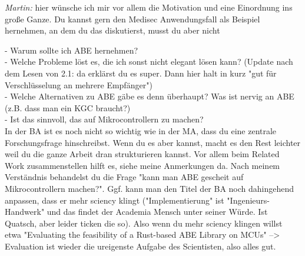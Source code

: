\emph{Martin: }
hier wünsche ich mir vor allem die Motivation und eine Einordnung ins große Ganze. Du kannst gern den Medisec Anwendungsfall als Beispiel hernehmen, an dem du das diskutierst, musst du aber nicht

- Warum sollte ich ABE hernehmen?\\ 
- Welche Probleme löst es, die ich sonst nicht elegant lösen kann? (Update nach dem Lesen von 2.1: da erklärst du es super. Dann hier halt in kurz "gut für Verschlüsselung an mehrere Empfänger") \\
- Welche Alternativen zu ABE gäbe es denn überhaupt? Was ist nervig an ABE (z.B. dass man ein KGC braucht?)\\
- Ist das sinnvoll, das auf Mikrocontrollern zu machen? \\

In der BA ist es noch nicht so wichtig wie in der MA, dass du eine zentrale Forschungsfrage hinschreibst. Wenn du es aber kannst, macht es den Rest leichter weil du die ganze Arbeit dran strukturieren kannst. Vor allem beim Related Work zusammenstellen hilft es, siehe meine Anmerkungen da. 
Nach meinem Verständnis behandelst du die Frage "kann man ABE gescheit auf Mikrocontrollern machen?". Ggf. kann man den Titel der BA noch dahingehend anpassen, dass er mehr sciency klingt ("Implementierung" ist "Ingenieurs-Handwerk" und das findet der Academia Mensch unter seiner Würde. Ist Quatsch, aber leider ticken die so). Also wenn du mehr sciency klingen willst etwa "Evaluating the feasibility of a Rust-based ABE Library on MCUs" --> Evaluation ist wieder die ureigenste Aufgabe des Scientisten, also alles gut.






